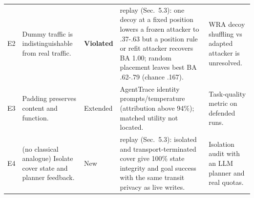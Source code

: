 \begin{table}[t]
\begin{tabularx}{\textwidth}{@{}l>{\raggedright\arraybackslash}X>{\raggedright\arraybackslash}p{2.1cm}>{\raggedright\arraybackslash}X>{\raggedright\arraybackslash}X@{}}
E2 & Dummy traffic is indistinguishable from real traffic. & \textbf{Violated} & replay (Sec.~5.3): one decoy at a fixed position lowers a frozen attacker to .37-.63 but a position rule or refit attacker recovers BA 1.00; random placement leaves best BA .62-.79 (chance .167). & WRA decoy shuffling vs adapted attacker is unresolved.\\
E3 & Padding preserves content and function. & Extended & AgentTrace identity prompts/temperature (attribution above 94\%); matched utility not located. & Task-quality metric on defended runs.\\
E4 & (no classical analogue) Isolate cover state and planner feedback. & New & replay (Sec.~5.3): isolated and transport-terminated cover give 100\% state integrity and goal success with the same transit privacy as live writes. & Isolation audit with an LLM planner and real quotas.\\
\bottomrule\end{tabularx}\end{table}
